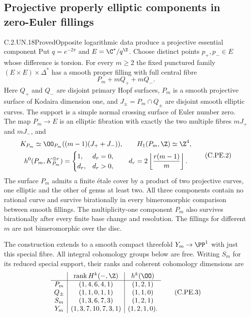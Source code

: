 \subsection{Projective properly elliptic components in zero-Euler fillings}

\begin{statement}{C.2.UN.18}{Proved}{Opposite logarithmic data produce a projective essential component}
Put $q=e^{-2\pi}$ and $E=\C^*/q^{\Z}$. Choose distinct
points $p_+,p_-\in E$ whose difference is torsion.
For every $m\ge2$ the fixed punctured family
$(E\times E)\times\Delta^*$ has a smooth proper filling
with full central fibre
\[
                         P_m+mQ_++mQ_-.                 \tag{C.PE.1}
\]
Here $Q_+$ and $Q_-$ are disjoint primary Hopf surfaces,
$P_m$ is a smooth projective surface of Kodaira dimension
one, and $J_\pm=P_m\cap Q_\pm$ are disjoint smooth
elliptic curves. The support is a simple normal crossing
surface of Euler number zero. The map $P_m\to E$ is an
elliptic fibration with exactly the two multiple fibres
$mJ_+$ and $mJ_-$, and
\[
 \begin{gathered}
 K_{P_m}\simeq\OO_{P_m}((m-1)(J_++J_-)),\qquad
 H_1(P_m,\Z)\simeq\Z^4,\\
 h^0(P_m,K_{P_m}^{\otimes r})=
 \begin{cases}1,&d_r=0,\\d_r,&d_r>0,\end{cases}
 \qquad d_r=2\left\lfloor\frac{r(m-1)}m\right\rfloor.
 \end{gathered}                                         \tag{C.PE.2}
\]
The surface $P_m$ admits a finite \'etale cover by a
product of two projective curves, one elliptic and the
other of genus at least two. All three components contain
no rational curve and survive birationally in every
bimeromorphic comparison between smooth fillings. The
multiplicity-one component $P_m$ also survives birationally
after every finite base change and resolution. The
fillings for different $m$ are not bimeromorphic over the
disc.

The construction extends to a smooth compact threefold
$Y_m\to\PP^1$ with just this special fibre. All integral
cohomology groups below are free. Writing $S_m$ for its
reduced special support, their ranks and coherent
cohomology dimensions are
\[
 \begin{array}{c|c|c}
 &\operatorname{rank}H^k(-,\Z)&h^k(\OO)\\ \hline
 P_m&(1,4,6,4,1)&(1,2,1)\\
 Q_\pm&(1,1,0,1,1)&(1,1,0)\\
 S_m&(1,3,6,7,3)&(1,2,1)\\
 Y_m&(1,3,7,10,7,3,1)&(1,2,1,0).
 \end{array}                                           \tag{C.PE.3}
\]
\end{statement}
